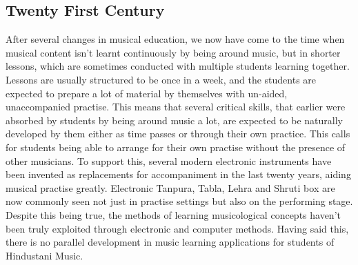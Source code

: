 \documentclass{tufte-handout}
\begin{document}
\subsection{Twenty First Century}After several changes in musical education, we now have come to the time when musical content isn't learnt continuously by being around music, but in shorter lessons, which are sometimes conducted with multiple students learning together. Lessons are usually structured to be once in a week, and the students are expected to prepare a lot of material by themselves with un-aided, unaccompanied practise. This means that several critical skills, that earlier were absorbed by students by being around music a lot, are expected to be naturally developed by them either as time passes or through their own practice. This calls for students being able to arrange for their own practise without the presence of other musicians. To support this, several modern electronic instruments have been invented as replacements for accompaniment in the last twenty years, aiding musical practise greatly. Electronic Tanpura, Tabla, Lehra and Shruti box are now commonly seen not just in practise settings but also on the performing stage. Despite this being true, the methods of learning musicological concepts haven't been truly exploited through electronic and computer methods. Having said this, there is no parallel development in music learning applications for students of Hindustani Music. 
\end{document}
